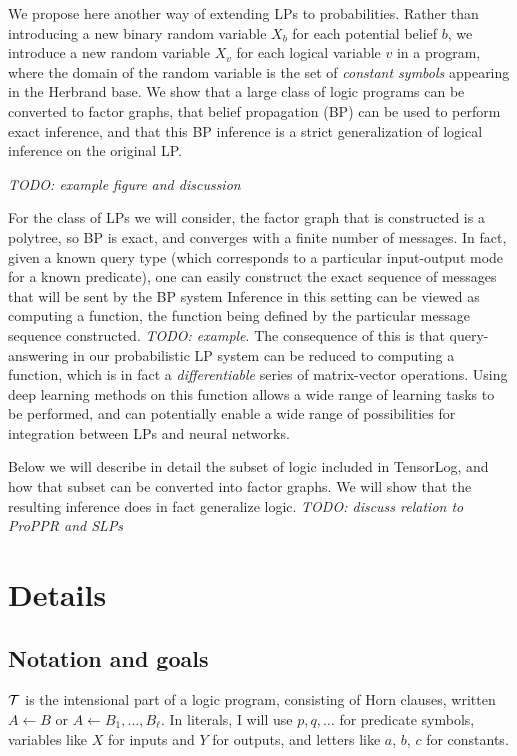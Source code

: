 \documentclass[12pt]{article}
\newcommand{\yy}[1]{\textit{TODO: {#1}}}
\begin{document}
We propose here another way of extending LPs to probabilities.  Rather
than introducing a new binary random variable $X_b$ for each potential
belief $b$, we introduce a new random variable $X_v$ for each logical
variable $v$ in a program, where the domain of the random variable is
the set of \emph{constant symbols} appearing in the Herbrand base.  We
show that a large class of logic programs can be converted to factor
graphs, that belief propagation (BP) can be used to perform exact
inference, and that this BP inference is a strict generalization of
logical inference on the original LP.  

\yy{example figure and discussion}

For the class of LPs we will consider, the factor graph that is
constructed is a polytree, so BP is exact, and converges with a finite
number of messages.  In fact, given a known query type (which
corresponds to a particular input-output mode for a known predicate),
one can easily construct the exact sequence of messages that will be
sent by the BP system Inference in this setting can be viewed as
computing a function, the function being defined by the particular
message sequence constructed.  \yy{example}.  The consequence of this
is that query-answering in our probabilistic LP system can be reduced
to computing a function, which is in fact a \emph{differentiable}
series of matrix-vector operations.  Using deep learning methods on
this function allows a wide range of learning tasks to be performed,
and can potentially enable a wide range of possibilities for
integration between LPs and neural networks.

Below we will describe in detail the subset of logic included in
TensorLog, and how that subset can be converted into factor graphs.
We will show that the resulting inference does in fact generalize
logic.  \yy{discuss relation to ProPPR and SLPs}

\section{Details}

\subsection{Notation and goals}

${\cal T}$ is the intensional part of a logic program, consisting of Horn
clauses, written $A\leftarrow{}B$ or $A\leftarrow{}B_1,\ldots,B_\ell$.
In literals, I will use $p,q,\ldots$ for predicate symbols, variables
like $X$ for inputs and $Y$ for outputs, and letters like $a$, $b$,
$c$ for constants.
\end{document}
